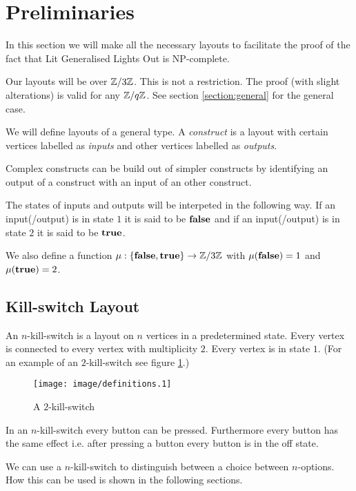 \section{Preliminaries}

In this section we will make all the necessary layouts to facilitate the
proof of the fact that Lit Generalised Lights Out is NP-complete.

Our layouts will be over $\mathbb{Z}/3\mathbb{Z}$. This is not a restriction. The proof
(with slight alterations) is valid for any $\mathbb{Z}/q\mathbb{Z}$. See section
\ref{section:general} for the general case.

We will define layouts of a general type. A \emph{construct} is a layout
with certain vertices labelled as \emph{inputs} and other vertices
labelled as \emph{outputs}.

Complex constructs can be build out of simpler constructs by
identifying an output of a construct with an input of an other
construct.

The states of inputs and outputs will be interpeted in the following
way. If an input(/output) is in state $1$ it is said to be ${\text{\bf false}}$ and if
an input(/output) is in state $2$ it is said to be $\text{\bf true}$.

We also define a function $\mu : \{{\text{\bf false}},\text{\bf true}\} \rightarrow \mathbb{Z}/3\mathbb{Z}$ with
$\mu({\text{\bf false}}) = 1$ and $\mu(\text{\bf true}) = 2$.

\subsection{Kill-switch Layout}

An  $n$-kill-switch is a layout on $n$ vertices in a predetermined
state. Every vertex is connected to every vertex with multiplicity $2$.
Every vertex is in state $1$. (For an example of an $2$-kill-switch see
figure \ref{figure:killswitch}.) 
\begin{figure}
	\begin{center}
		\texttt{[image: image/definitions.1]}
	\end{center}
	\caption{A $2$-kill-switch}\label{figure:killswitch}
\end{figure}

In an $n$-kill-switch every button can be pressed. Furthermore every
button has the same effect i.e. after pressing a button every button is
in the off state.
 
We can use a $n$-kill-switch to distinguish between a choice between
$n$-options. How this can be used is shown in the following sections.

